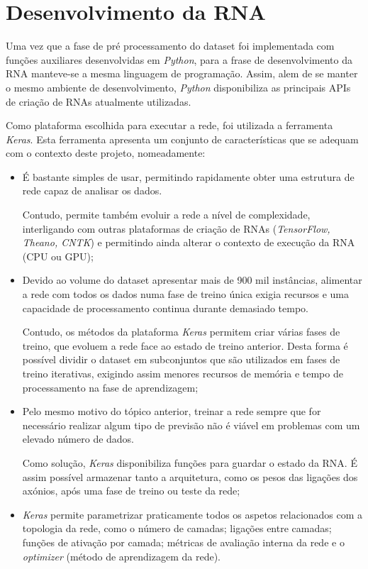 \chapter{Desenvolvimento da RNA}
\label{chp:criacaoRNAs}

Uma vez que a fase de pré processamento do dataset foi implementada com funções auxiliares desenvolvidas em \textit{Python}, para a frase de desenvolvimento da RNA manteve-se a mesma linguagem de programação. Assim, alem de se manter o mesmo ambiente de desenvolvimento, \textit{Python} disponibiliza as principais APIs de criação de RNAs atualmente utilizadas. 

Como plataforma escolhida para executar a rede, foi utilizada a ferramenta \textit{Keras}. 
Esta ferramenta apresenta um conjunto de características que se adequam com o contexto deste projeto, nomeadamente: 
\begin{itemize}
    \item É bastante simples de usar, permitindo rapidamente obter uma estrutura de rede capaz de analisar os dados. 
    
    Contudo, permite também evoluir a rede a nível de complexidade, interligando com outras plataformas de criação de RNAs (\textit{TensorFlow, Theano, CNTK}) e permitindo ainda alterar o contexto de execução da RNA (CPU ou GPU);
    
    \item Devido ao volume do dataset apresentar mais de 900 mil instâncias, alimentar a rede com todos os dados numa fase de treino única exigia recursos e uma capacidade de processamento continua durante demasiado tempo. 
    
    Contudo, os métodos da plataforma \textit{Keras} permitem criar várias fases de treino, que evoluem a rede face ao estado de treino anterior. Desta forma é possível dividir o dataset em subconjuntos que são utilizados em fases de treino iterativas, exigindo assim menores recursos de memória e tempo de processamento na fase de aprendizagem;
    
    \item Pelo mesmo motivo do tópico anterior, treinar a rede sempre que for necessário realizar algum tipo de previsão não é viável em problemas com um elevado número de dados. 
    
    Como solução, \textit{Keras} disponibiliza funções para guardar o estado da RNA. É assim possível armazenar tanto a arquitetura, como os pesos das ligações dos axónios, após uma fase de treino ou teste da rede;
    
    \item \textit{Keras} permite parametrizar praticamente todos os aspetos relacionados com a topologia da rede, como o número de camadas; ligações entre camadas; funções de ativação por camada; métricas de avaliação interna da rede e o \textit{optimizer} (método de aprendizagem da rede). 
\end{itemize}

